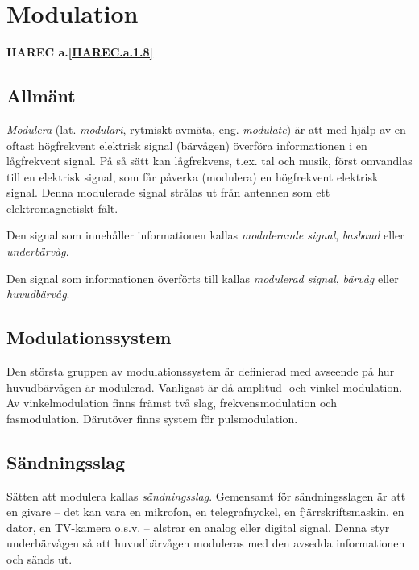 \section{Modulation}
\textbf{HAREC a.\ref{HAREC.a.1.8}\label{myHAREC.a.1.8}}
\label{modulation}

\subsection{Allmänt}

\emph{Modulera} (lat. \emph{modulari}, rytmiskt avmäta, eng. \emph{modulate})
är att med hjälp av en oftast högfrekvent elektrisk signal (bärvågen) överföra
informationen i en lågfrekvent signal.
På så sätt kan lågfrekvens, t.ex. tal och musik, först omvandlas till en
elektrisk signal, som får påverka (modulera) en högfrekvent elektrisk signal.
Denna modulerade signal strålas ut från antennen som ett elektromagnetiskt fält.

Den signal som innehåller informationen kallas \emph{modulerande signal},
\emph{basband} eller \emph{underbärvåg}.

Den signal som informationen överförts till kallas \emph{modulerad signal},
\emph{bärvåg} eller \emph{huvudbärvåg}.

\subsection{Modulationssystem}

Den största gruppen av modulationssystem är definierad med avseende på hur
huvudbärvågen är modulerad.
Vanligast är då amplitud- och vinkel modulation.
Av vinkelmodulation finns främst två slag, frekvensmodulation och fasmodulation.
Därutöver finns system för pulsmodulation.

\subsection{Sändningsslag}

Sätten att modulera kallas \emph{sändningsslag}.
Gemensamt för sändningsslagen är att en givare -- det kan vara en mikrofon, en
telegrafnyckel, en fjärrskriftsmaskin, en dator, en TV-kamera o.s.v. -- alstrar
en analog eller digital signal.
Denna styr underbärvågen så att huvudbärvågen moduleras med den avsedda
informationen och sänds ut.

